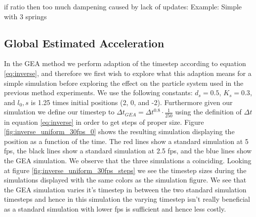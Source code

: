 \documentclass[11pt]{article}
\begin{document}
\begin{figure}
\begin{subfigure}[t]{0.5\textwidth}
        \caption{}
        \label{fig:atomic_uniform_10fps_1}
    \end{subfigure}
    \caption{}
    \label{fig:atomic_uniform}
\end{figure}


if ratio then too much dampening caused by lack of updates: Example: Simple with
3 springs

\subsection{Global Estimated Acceleration}
In the GEA method we perform adaption of the timestep according to equation
\ref{eq:inverse}, and therefore we first wish to explore what this adaption
means for a simple simulation before exploring the effect on the particle
system used in the previous method experiments. We use the following
constants: $d_s = 0.5$, $K_s = 0.3$, and $l_0,s$ is 1.25 times initial
positions (2, 0, and -2). Furthermore given our simulation we define our
timestep to $\Delta t_{GEA} = \Delta t^{0.8}\cdot \frac{1}{250}$ using the definition of
$\Delta t$ in equation \ref{eq:inverse} in order to get steps of proper size.
Figure \ref{fig:inverse_uniform_30fps_0} shows the resulting simulation
displaying the position as a function of the time. The red lines show a standard
simulation at 5 fps, the black lines show a standard simulation at 2.5 fps, and
the blue lines show the GEA simulation. We observe that the three simulations a
coinciding. Looking at figure \ref{fig:inverse_uniform_30fps_steps} we see the
timestep sizes during the simulations displayed with the same colors as the
simulation figure. We see that the GEA simulation varies it's timestep in
between the two standard simulation timesteps and hence in this simulation the
varying timestep isn't really beneficial as a standard simulation with lower fps
is sufficient and hence less costly.
\end{document}
